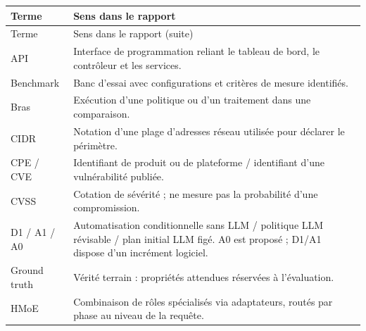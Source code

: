 \documentclass[11pt,a4paper]{article}
\begin{document}
\begin{longtable}{@{}>{\raggedright\arraybackslash}p{27mm}>{\raggedright\arraybackslash}p{128mm}@{}}
\toprule Terme & Sens dans le rapport\\\midrule\endfirsthead
\toprule Terme & Sens dans le rapport (suite)\\\midrule\endhead
\bottomrule\endfoot
API & Interface de programmation reliant le tableau de bord, le contrôleur et les services.\\
Benchmark & Banc d'essai avec configurations et critères de mesure identifiés.\\
Bras & Exécution d'une politique ou d'un traitement dans une comparaison.\\
CIDR & Notation d'une plage d'adresses réseau utilisée pour déclarer le périmètre.\\
CPE / CVE & Identifiant de produit ou de plateforme / identifiant d'une vulnérabilité publiée.\\
CVSS & Cotation de sévérité ; ne mesure pas la probabilité d'une compromission.\\
D1 / A1 / A0 & Automatisation conditionnelle sans LLM / politique LLM révisable / plan initial LLM figé. A0 est proposé ; D1/A1 dispose d'un incrément logiciel.\\
Ground truth & Vérité terrain : propriétés attendues réservées à l'évaluation.\\
HMoE & Combinaison de rôles spécialisés via adaptateurs, routés par phase au niveau de la requête.\\


\end{longtable}
\end{document}
